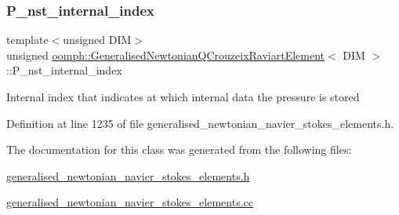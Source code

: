 \subsubsection{\texorpdfstring{P\+\_\+nst\+\_\+internal\+\_\+index}{P\_nst\_internal\_index}}
{\footnotesize\ttfamily template$<$unsigned D\+IM$>$ \\
unsigned \hyperlink{classoomph_1_1GeneralisedNewtonianQCrouzeixRaviartElement}{oomph\+::\+Generalised\+Newtonian\+Q\+Crouzeix\+Raviart\+Element}$<$ D\+IM $>$\+::P\+\_\+nst\+\_\+internal\+\_\+index\hspace{0.3cm}{\ttfamily [protected]}}

Internal index that indicates at which internal data the pressure is stored 

Definition at line 1235 of file generalised\+\_\+newtonian\+\_\+navier\+\_\+stokes\+\_\+elements.\+h.



The documentation for this class was generated from the following files\+:\begin{DoxyCompactItemize}
\item 
\hyperlink{generalised__newtonian__navier__stokes__elements_8h}{generalised\+\_\+newtonian\+\_\+navier\+\_\+stokes\+\_\+elements.\+h}\item 
\hyperlink{generalised__newtonian__navier__stokes__elements_8cc}{generalised\+\_\+newtonian\+\_\+navier\+\_\+stokes\+\_\+elements.\+cc}\end{DoxyCompactItemize}
